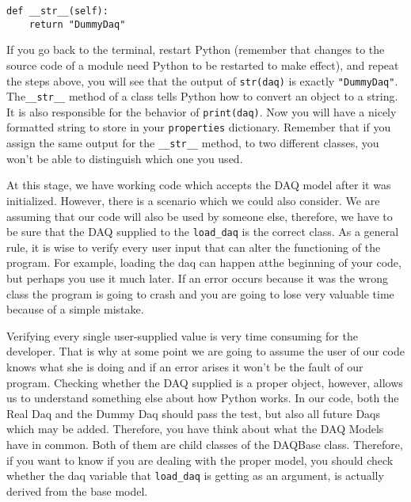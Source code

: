 {\begin{verbatim}
def __str__(self):
    return "DummyDaq"
\end{verbatim}

If you go back to the terminal, restart Python (remember that changes to the source code of a module need Python to be restarted to make effect), and repeat the steps above, you will see that the output of \texttt{str(daq)} is exactly \texttt{"DummyDaq"}. The\texttt{__str__} method of a class tells Python how to convert an
object to a string. It is also responsible for the behavior of \texttt{print(daq)}. Now you will have a nicely formatted string to store in your \texttt{properties} dictionary. Remember that if you assign the same output for the \texttt{__str__} method, to two different classes, you won't be able to distinguish which one you used. 


At this stage, we have working code which accepts the DAQ model after it was initialized. However, there is a scenario which we could also consider. We are assuming that our code will also be used by someone else, therefore, we have to be sure that the DAQ supplied to the \texttt{load_daq} is the correct class. As a general rule, it is wise to verify every user input that can alter the functioning of the program. For example, loading the daq can happen atthe beginning of your code, but perhaps you use it much later. If an error occurs because it was the wrong class the program is going to crash and you are going to lose very valuable time because of a simple mistake.

Verifying every single user-supplied value is very time consuming for the developer. That is why at some point we are going to assume the user of our code knows what she is doing and if an error arises it won't be the fault of our program. Checking whether the DAQ supplied is a proper object, however, allows us to understand something else about how Python works. In our code, both the Real Daq and the Dummy Daq should pass the test, but also all future Daqs which may be added. Therefore, you have think about what the {DAQ} Models have in common. Both of them are child classes of the DAQBase class. Therefore, if you want to know if you are dealing with the proper model, you should check whether the daq variable that \texttt{load_daq} is getting as an argument, is actually derived from the base model. 

}
